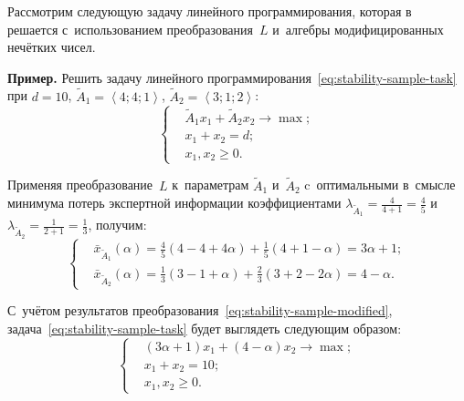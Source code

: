 Рассмотрим следующую задачу линейного программирования, которая в~\cite{Vorontsov_PI} решается с~использованием преобразования~$L$ и~алгебры модифицированных нечётких чисел.

\textbf{Пример.} Решить задачу линейного программирования~\eqref{eq:stability-sample-task} при $d=10$, $\tilde A_1 = \left \langle 4; 4; 1 \right \rangle$, $\tilde A_2 = \left \langle 3; 1; 2\right \rangle$:
\begin{equation}
\label{eq:stability-sample-task}
  \left\{ \begin{aligned}
    & \tilde A_1 x_1 + \tilde A_2 x_2 \to \max; \\
    & x_1 + x_2 = d; \\
    & x_1, x_2 \geqslant 0.
  \end{aligned} \right.
\end{equation}

Применяя преобразование~$L$ к~параметрам $\tilde A_1$ и~$\tilde A_2$ c~оптимальными в~смысле минимума потерь экспертной информации коэффициентами $\displaystyle \lambda_{\tilde A_1}=\frac{4}{4+1}=\frac{4}{5}$ и $\displaystyle \lambda_{\tilde A_2}=\frac{1}{2+1}=\frac{1}{3}$, получим:
\begin{equation}
\label{eq:stability-sample-modified}
  \left\{ \begin{aligned}
    & \bar{x}_{\tilde A_1}\left(\alpha \right)=\frac{4}{5}\left(4-4+4\alpha \right)+\frac{1}{5}\left(4+1-\alpha \right)=3\alpha+1; \\
    & \bar{x}_{\tilde A_2}\left(\alpha \right)=\frac{1}{3}\left(3-1+\alpha \right)+\frac{2}{3}\left(3+2-2\alpha \right)=4-\alpha.
  \end{aligned} \right.
\end{equation}

С~учётом результатов преобразования~\eqref{eq:stability-sample-modified}, задача~\eqref{eq:stability-sample-task} будет выглядеть следующим образом:
\begin{equation}
\label{eq:stability-sample-task-modified}
  \left\{ \begin{aligned}
    & \left( 3\alpha+1\right)x_1+\left(4-\alpha \right)x_2 \to \max; \\
    & x_1 + x_2 = 10; \\
    & x_1, x_2 \geqslant 0.
  \end{aligned} \right.
\end{equation}

